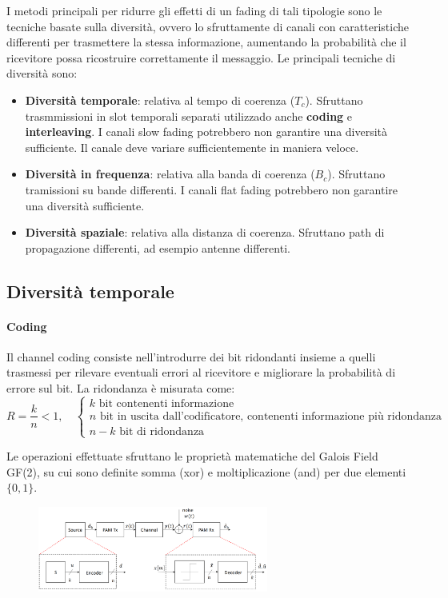 I metodi principali per ridurre gli effetti di un fading di tali tipologie sono le tecniche basate sulla diversità, ovvero lo sfruttamente di canali con caratteristiche differenti per trasmettere la stessa informazione, aumentando la probabilità che il ricevitore possa ricostruire correttamente il messaggio.
Le principali tecniche di diversità sono:
\begin{itemize}
    \item \textbf{Diversità temporale}: relativa al tempo di coerenza ($T_c$). Sfruttano trasmmissioni in slot temporali separati utilizzado anche \textbf{coding} e \textbf{interleaving}. I canali slow fading potrebbero non garantire una diversità sufficiente. Il canale deve variare sufficientemente in maniera veloce.
    \item \textbf{Diversità in frequenza}: relativa alla banda di coerenza ($B_c$). Sfruttano tramissioni su bande differenti. I canali flat fading potrebbero non garantire una diversità sufficiente.
    \item \textbf{Diversità spaziale}: relativa alla distanza di coerenza. Sfruttano path di propagazione differenti, ad esempio antenne differenti.
\end{itemize}

\subsection*{Diversità temporale}
\paragraph*{Coding}
Il channel coding consiste nell'introdurre dei bit ridondanti insieme a quelli trasmessi per rilevare eventuali errori al ricevitore e migliorare la probabilità di errore sul bit. 
La ridondanza è misurata come:
\[
    R = \frac{k}{n} < 1, \quad \begin{cases}
        k \text{ bit contenenti informazione} \\
        n \text{ bit in uscita dall'codificatore, contenenti informazione più ridondanza} \\
        n - k \text{ bit di ridondanza}
    \end{cases}
\]

Le operazioni effettuate sfruttano le proprietà matematiche del Galois Field GF(2), su cui sono definite somma (xor) e moltiplicazione (and) per due elementi $\{0, 1\}$.

\begin{figure}[ht]
    \centering
    \includegraphics[width=0.675\textwidth]{imgs/encoder_decoder.jpg}
\end{figure}

